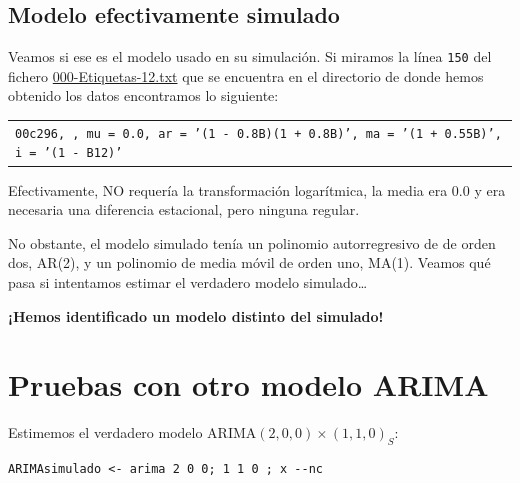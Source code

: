 \documentclass[10pt]{article}
\begin{document}
\subsection*{Modelo efectivamente simulado}
\label{sec:orgefc5d4d}

Veamos si ese es el modelo usado en su simulación. Si miramos la línea
\texttt{150} del fichero \href{IdentificaEstosARIMA/000-Etiquetas-12.txt}{000-Etiquetas-12.txt} que se encuentra en el directorio de
donde hemos obtenido los datos encontramos lo siguiente:
\medskip

\begin{center}
\begin{tabular}{l}
\texttt{00c296,	    ,	mu = 0.0,	ar = '(1 - 0.8B)(1 + 0.8B)', ma = '(1 + 0.55B)', i = '(1 - B12)'}\\
\end{tabular}
\end{center}

\medskip

Efectivamente, NO requería la transformación logarítmica, la media era
\(0.0\) y era necesaria una diferencia estacional, pero ninguna regular.

No obstante, el modelo simulado tenía un polinomio autorregresivo de
de orden dos, AR(2), y un polinomio de media móvil de orden uno,
MA(1). Veamos qué pasa si intentamos estimar el verdadero modelo
simulado\ldots{}

\textbf{¡Hemos identificado un modelo distinto del simulado!}
\section*{Pruebas con otro modelo ARIMA}
\label{sec:org22fc477}

Estimemos el verdadero modelo ARIMA\((2,0,0)\times(1,1,0)_{S}\):

\begin{verbatim}
ARIMAsimulado <- arima 2 0 0; 1 1 0 ; x --nc
\end{verbatim}
\end{document}
